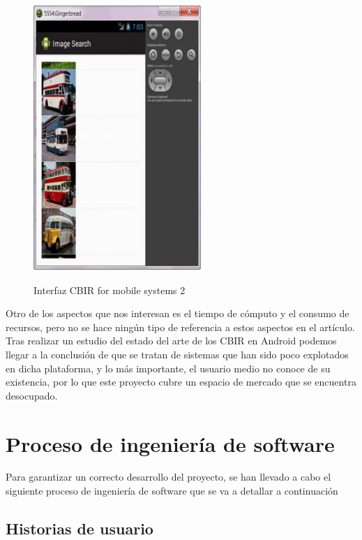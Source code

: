 \begin{figure}[H] %
\centering
\includegraphics[scale=0.6]{imagenes/articulo12.png}  %
\label{articulo11}
\caption{Interfaz CBIR for mobile systems 2}
\end{figure}

Otro de los aspectos que nos interesan es el tiempo de cómputo y el consumo de recursos, pero no se hace ningún tipo de referencia a estos aspectos en el artículo.\\

Tras realizar un estudio del estado del arte de los CBIR en Android podemos llegar a la conclusión de que se tratan de sistemas que han sido poco explotados en dicha plataforma, y lo más importante, el usuario medio no conoce de su existencia, por lo que este proyecto cubre un espacio de mercado que se encuentra desocupado.\\

\section{Proceso de ingeniería de software}

Para garantizar un correcto desarrollo del proyecto, se han llevado a cabo el siguiente proceso de ingeniería de software que se va a detallar a continuación

\subsection{Historias de usuario}

